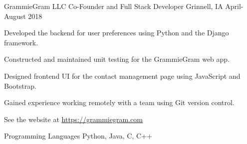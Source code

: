 \documentclass[12pt, a4paper]{awesome-cv}
\begin{document}
\begin{cventries}


  \cventry
    {GrammieGram LLC}
    {Co-Founder and Full Stack Developer}
    {Grinnell, IA}
    {April-August 2018}
    {
      \begin{cvitems}
        \item {Developed the backend for user preferences using Python and the Django framework.}
        \item {Constructed and maintained unit testing for the GrammieGram web app.}
        \item {Designed frontend UI for the contact management page using JavaScript and Bootstrap.}
        \item {Gained experience working remotely with a team using Git version control.}
	      \item {See the website at \underline{\href{https://grammiegram.com}{https://grammiegram.com}}}
      \end{cvitems}
    }



\end{cventries}


\begin{cvskills}
  \cvskill
    {Programming Languages} 
    {Python, Java, C, C++} 

\end{cvskills}
\end{document}
